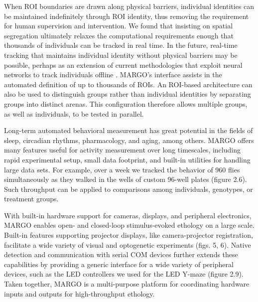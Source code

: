 \documentclass[12pt,letterpaper]{article}
\begin{document}
When ROI boundaries are drawn along physical barriers, individual identities can be maintained indefinitely through ROI identity, thus removing the requirement for human supervision and intervention. We found that insisting on spatial segregation ultimately relaxes the computational requirements enough that thousands of individuals can be tracked in real time. In the future, real-time tracking that maintains individual identity without physical barriers may be possible, perhaps as an extension of current methodologies that exploit neural networks to track individuals offline \cite{romero-ferrero_2019,schneider_2018}. MARGO's interface assists in the automated definition of up to thousands of ROIs. An ROI-based architecture can also be used to distinguish groups rather than individual identities by separating groups into distinct arenas. This configuration therefore allows multiple groups, as well as individuals, to be tested in parallel.

Long-term automated behavioral measurement has great potential in the fields of sleep, circadian rhythms, pharmacology, and aging, among others. MARGO offers many features useful for activity measurement over long timescales, including rapid experimental setup, small data footprint, and built-in utilities for handling large data sets. For example, over a week we tracked the behavior of 960 flies simultaneously as they walked in the wells of custom 96-well plates (figure 2.6). Such throughput can be applied to comparisons among individuals, genotypes, or treatment groups. 

With built-in hardware support for cameras, displays, and peripheral electronics, MARGO enables open- and closed-loop stimulus-evoked ethology on a large scale. Built-in features supporting projector displays, like camera-projector registration, facilitate a wide variety of visual and optogenetic experiments (figs. 5, 6). Native detection and communication with serial COM devices further extends these capabilities by providing a generic interface for a wide variety of peripheral devices, such as the LED controllers we used for the LED Y-maze (figure 2.9). Taken together, MARGO is a multi-purpose platform for coordinating hardware inputs and outputs for high-throughput ethology. 
\end{document}
